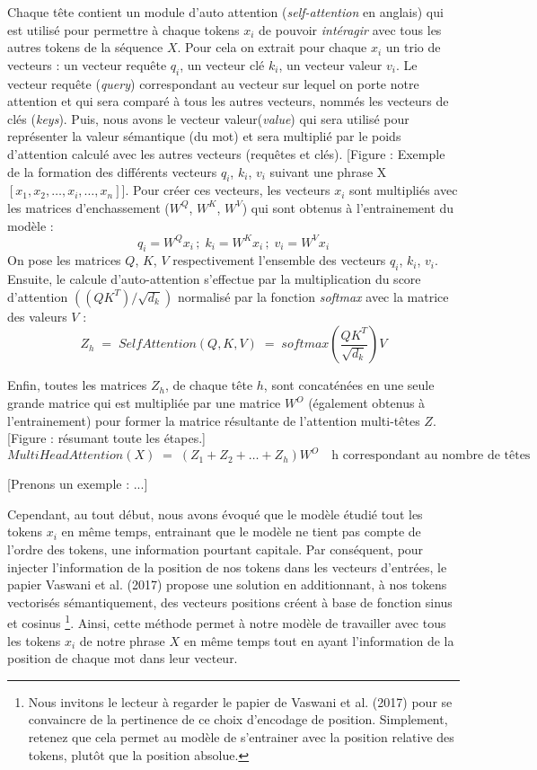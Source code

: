 \documentclass[12pt, french]{report}
\begin{document}
Chaque tête contient un module d'auto attention (\textit{self-attention} en anglais) qui est utilisé pour permettre à chaque tokens $x_i$ de pouvoir \textit{intéragir} avec tous les autres tokens de la séquence $X$. Pour cela on extrait pour chaque $x_i$ un trio de vecteurs : un vecteur requête $q_i$, un vecteur clé $k_i$, un vecteur valeur $v_i$. Le vecteur requête (\textit{query}) correspondant au vecteur sur lequel on porte notre attention et qui sera comparé à tous les autres vecteurs, nommés les vecteurs de clés (\textit{keys}). Puis, nous avons le vecteur valeur(\textit{value}) qui sera utilisé pour représenter la \og valeur sémantique (du mot)\fg\; et sera multiplié par le poids d'attention calculé avec les autres vecteurs (requêtes et clés). [Figure : Exemple de la formation des différents vecteurs $q_i$, $k_i$, $v_i$ suivant une phrase X $[x_1, x_2, \dots, x_i, \dots, x_n]$]. Pour créer ces vecteurs, les vecteurs $x_i$ sont multipliés avec les matrices d'enchassement ($W^Q$, $W^K$, $W^V$) qui sont obtenus à l'entrainement du modèle : 
\[ q_i = W^Q x_i \,;\; k_i = W^K x_i \,;\; v_i = W^V x_i\]
On pose les matrices $Q$, $K$, $V$ respectivement l'ensemble des vecteurs $q_i$, $k_i$, $v_i$.\\

Ensuite, le calcule d'auto-attention s'effectue par la multiplication du score d'attention $((QK^T)/\sqrt{d_k})$ normalisé par la fonction \textit{softmax} avec la matrice des valeurs $V$ :
\[Z_h\; =\; SelfAttention(Q, K, V)\; =\; softmax(\frac{QK^T}{\sqrt{d_k}})V\]

Enfin, toutes les matrices $Z_h$, de chaque tête $h$, sont concaténées en une seule grande matrice qui est multipliée par une matrice $W^O$ (également obtenus à l'entrainement) pour former la matrice résultante de l'attention multi-têtes $Z$. [Figure : résumant toute les étapes.]
\[MultiHeadAttention(X)\;=\;(Z_1 + Z_2 + \dots + Z_h)W^O \quad \text{h correspondant au nombre de têtes}\]

[Prenons un exemple : ...]

Cependant, au tout début, nous avons évoqué que le modèle étudié tout les tokens $x_i$ en même temps, entrainant que le modèle ne tient pas compte de l'ordre des tokens, une information pourtant capitale. Par conséquent, pour injecter l'information de la position de nos tokens dans les vecteurs d'entrées, le papier Vaswani et al. (2017) propose une solution en additionnant, à nos tokens vectorisés sémantiquement, des vecteurs positions créent à base de fonction sinus et cosinus \footnote{Nous invitons le lecteur à regarder le papier de Vaswani et al. (2017) pour se convaincre de la pertinence de ce choix d'encodage de position. Simplement, retenez que cela permet au modèle de s'entrainer avec la position relative des tokens, plutôt que la position absolue.}. Ainsi, cette méthode permet à notre modèle de travailler avec tous les tokens $x_i$ de notre phrase $X$ en même temps tout en ayant l'information de la position de chaque mot dans leur vecteur.
\end{document}

